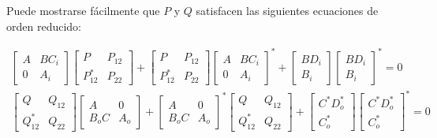 Puede mostrarse fácilmente que $P$ y $Q$ satisfacen las siguientes ecuaciones de orden reducido:


\begin{gather*}
{\left[\begin{array}{cc}
A & B C_{i} \\
0 & A_{i}
\end{array}\right]\left[\begin{array}{cc}
P & P_{12} \\
P_{12}^{*} & P_{22}
\end{array}\right]+\left[\begin{array}{cc}
P & P_{12} \\
P_{12}^{*} & P_{22}
\end{array}\right]\left[\begin{array}{cc}
A & B C_{i} \\
0 & A_{i}
\end{array}\right]^{*}+\left[\begin{array}{c}
B D_{i} \\
B_{i}
\end{array}\right]\left[\begin{array}{c}
B D_{i} \\
B_{i}
\end{array}\right]^{*}=0}  \tag{7.19}\\
{\left[\begin{array}{cc}
Q & Q_{12} \\
Q_{12}^{*} & Q_{22}
\end{array}\right]\left[\begin{array}{cc}
A & 0 \\
B_{o} C & A_{o}
\end{array}\right]+\left[\begin{array}{cc}
A & 0 \\
B_{o} C & A_{o}
\end{array}\right]^{*}\left[\begin{array}{cc}
Q & Q_{12} \\
Q_{12}^{*} & Q_{22}
\end{array}\right]+\left[\begin{array}{c}
C^{*} D_{o}^{*} \\
C_{o}^{*}
\end{array}\right]\left[\begin{array}{c}
C^{*} D_{o}^{*} \\
C_{o}^{*}
\end{array}\right]^{*}=0} \tag{7.20}
\end{gather*}


